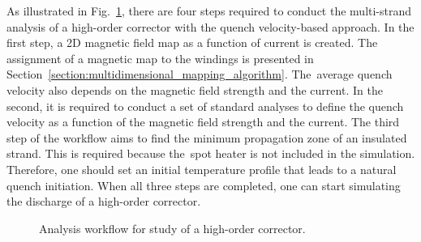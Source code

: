 
As illustrated in Fig.~\ref{fig:block_diagram_skew_quad_analysis_workflow}, there are four steps required to conduct the multi-strand analysis of a high-order corrector with the quench velocity-based approach. In the first step, a 2D magnetic field map as a function of current is created. The assignment of a magnetic map to the windings is presented in Section~\ref{section:multidimensional_mapping_algorithm}. The~average quench velocity also depends on the magnetic field strength and the current. In the second, it is required to conduct a set of standard analyses to define the quench velocity as a function of the magnetic field strength and the current. The third step of the workflow aims to find the minimum propagation zone of an insulated strand. This is required because the~spot heater is not included in the simulation. Therefore, one should set an initial temperature profile that leads to a natural quench initiation. When all three steps are completed, one can start simulating the discharge of a high-order corrector.

\begin{figure}[H]
    \centering
    \caption{Analysis workflow for study of a high-order corrector.}
    \label{fig:block_diagram_skew_quad_analysis_workflow}
\end{figure}

